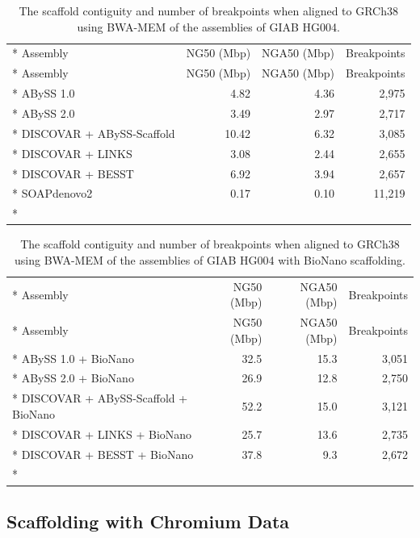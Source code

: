 \documentclass[
  12pt,
  oneside,
  openany]{book}
\begin{document}
\hypertarget{tbl:scaffolds}{}
\begin{singlespace}
\small
\begin{longtable}[]{@{}lrrr@{}}
\caption[The scaffold contiguity and number of breakpoints when aligned to GRCh38 using BWA-MEM of the assemblies of GIAB HG004.]{\label{tbl:scaffolds}The scaffold contiguity and number of breakpoints when aligned to GRCh38 using BWA-MEM of the assemblies of GIAB HG004.}\tabularnewline*
\toprule
Assembly & NG50 (Mbp) & NGA50 (Mbp) & Breakpoints\tabularnewline*
\midrule
\endfirsthead
\toprule
Assembly & NG50 (Mbp) & NGA50 (Mbp) & Breakpoints\tabularnewline*
\midrule
\endhead
ABySS 1.0 & 4.82 & 4.36 & 2,975\tabularnewline*
ABySS 2.0 & 3.49 & 2.97 & 2,717\tabularnewline*
DISCOVAR + ABySS-Scaffold & 10.42 & 6.32 & 3,085\tabularnewline*
DISCOVAR + LINKS & 3.08 & 2.44 & 2,655\tabularnewline*
DISCOVAR + BESST & 6.92 & 3.94 & 2,657\tabularnewline*
SOAPdenovo2 & 0.17 & 0.10 & 11,219\tabularnewline*
\bottomrule
\end{longtable}
\end{singlespace}

\hypertarget{tbl:bionano}{}
\begin{singlespace}
\small
\begin{longtable}[]{@{}lrrr@{}}
\caption[The scaffold contiguity and number of breakpoints when aligned to GRCh38 using BWA-MEM of the assemblies of GIAB HG004 with BioNano scaffolding.]{\label{tbl:bionano}The scaffold contiguity and number of breakpoints when aligned to GRCh38 using BWA-MEM of the assemblies of GIAB HG004 with BioNano scaffolding.}\tabularnewline*
\toprule
Assembly & NG50 (Mbp) & NGA50 (Mbp) & Breakpoints\tabularnewline*
\midrule
\endfirsthead
\toprule
Assembly & NG50 (Mbp) & NGA50 (Mbp) & Breakpoints\tabularnewline*
\midrule
\endhead
ABySS 1.0 + BioNano & 32.5 & 15.3 & 3,051\tabularnewline*
ABySS 2.0 + BioNano & 26.9 & 12.8 & 2,750\tabularnewline*
DISCOVAR + ABySS-Scaffold + BioNano & 52.2 & 15.0 & 3,121\tabularnewline*
DISCOVAR + LINKS + BioNano & 25.7 & 13.6 & 2,735\tabularnewline*
DISCOVAR + BESST + BioNano & 37.8 & 9.3 & 2,672\tabularnewline*
\bottomrule
\end{longtable}
\end{singlespace}

\hypertarget{scaffolding-with-chromium-data}{%
\subsection{Scaffolding with Chromium Data}\label{scaffolding-with-chromium-data}}
\end{document}
